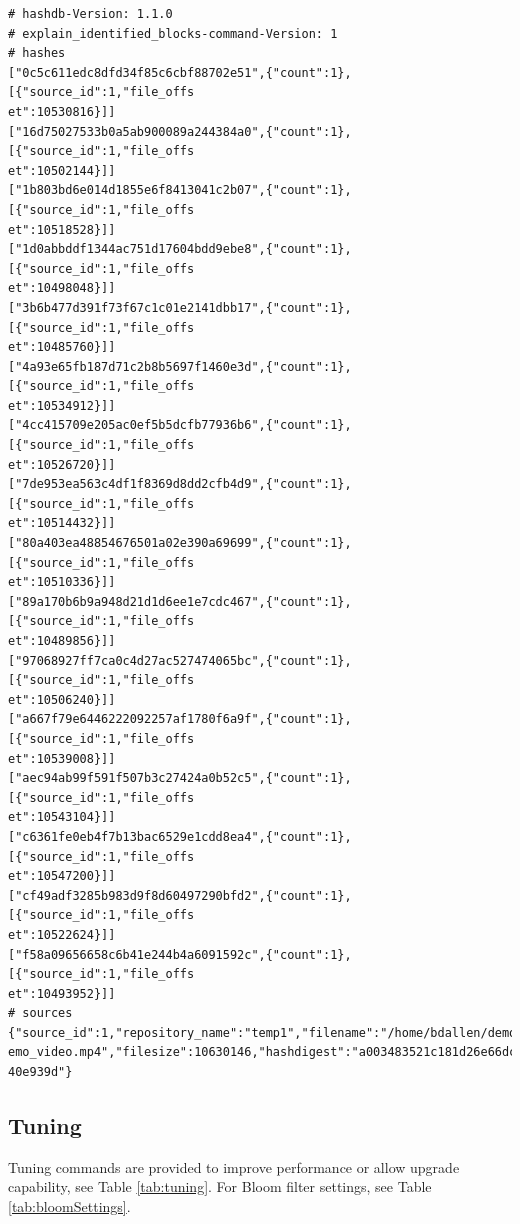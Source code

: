 \documentclass[11pt,fleqn]{article} %
\begin{document}
\begin{lstlisting}[float, caption={The \texttt{identified\_hashes\_and\_sources.txt} file produced by post-processing the \texttt{identified\_blocks.txt} file using the \texttt{explain\_identified\_blocks} command}, label=explainHashesAndSources]
# hashdb-Version: 1.1.0
# explain_identified_blocks-command-Version: 1
# hashes
["0c5c611edc8dfd34f85c6cbf88702e51",{"count":1},[{"source_id":1,"file_offs
et":10530816}]]
["16d75027533b0a5ab900089a244384a0",{"count":1},[{"source_id":1,"file_offs
et":10502144}]]
["1b803bd6e014d1855e6f8413041c2b07",{"count":1},[{"source_id":1,"file_offs
et":10518528}]]
["1d0abbddf1344ac751d17604bdd9ebe8",{"count":1},[{"source_id":1,"file_offs
et":10498048}]]
["3b6b477d391f73f67c1c01e2141dbb17",{"count":1},[{"source_id":1,"file_offs
et":10485760}]]
["4a93e65fb187d71c2b8b5697f1460e3d",{"count":1},[{"source_id":1,"file_offs
et":10534912}]]
["4cc415709e205ac0ef5b5dcfb77936b6",{"count":1},[{"source_id":1,"file_offs
et":10526720}]]
["7de953ea563c4df1f8369d8dd2cfb4d9",{"count":1},[{"source_id":1,"file_offs
et":10514432}]]
["80a403ea48854676501a02e390a69699",{"count":1},[{"source_id":1,"file_offs
et":10510336}]]
["89a170b6b9a948d21d1d6ee1e7cdc467",{"count":1},[{"source_id":1,"file_offs
et":10489856}]]
["97068927ff7ca0c4d27ac527474065bc",{"count":1},[{"source_id":1,"file_offs
et":10506240}]]
["a667f79e6446222092257af1780f6a9f",{"count":1},[{"source_id":1,"file_offs
et":10539008}]]
["aec94ab99f591f507b3c27424a0b52c5",{"count":1},[{"source_id":1,"file_offs
et":10543104}]]
["c6361fe0eb4f7b13bac6529e1cdd8ea4",{"count":1},[{"source_id":1,"file_offs
et":10547200}]]
["cf49adf3285b983d9f8d60497290bfd2",{"count":1},[{"source_id":1,"file_offs
et":10522624}]]
["f58a09656658c6b41e244b4a6091592c",{"count":1},[{"source_id":1,"file_offs
et":10493952}]]
# sources
{"source_id":1,"repository_name":"temp1","filename":"/home/bdallen/demo8/d
emo_video.mp4","filesize":10630146,"hashdigest":"a003483521c181d26e66dc097
40e939d"}
\end{lstlisting}

\subsection{Tuning}
Tuning commands are provided to improve performance or allow upgrade capability,
see Table \ref{tab:tuning}.
For Bloom filter settings, see Table \ref{tab:bloomSettings}.
\end{document}
